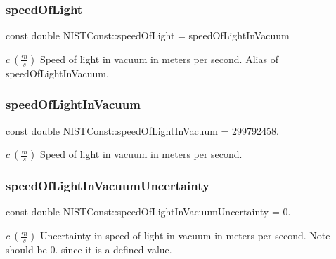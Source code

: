 \subsubsection{\texorpdfstring{speed\+Of\+Light}{speedOfLight}}
{\footnotesize\ttfamily const double N\+I\+S\+T\+Const\+::speed\+Of\+Light = speed\+Of\+Light\+In\+Vacuum}

$c \ (\frac{m}{s})$ Speed of light in vacuum in meters per second. Alias of speed\+Of\+Light\+In\+Vacuum. \mbox{\label{group___speed_of_light_gacb4a04d9cca33259effabdd28c28e964}} 
\subsubsection{\texorpdfstring{speed\+Of\+Light\+In\+Vacuum}{speedOfLightInVacuum}}
{\footnotesize\ttfamily const double N\+I\+S\+T\+Const\+::speed\+Of\+Light\+In\+Vacuum = 299792458.}

$c \ (\frac{m}{s})$ Speed of light in vacuum in meters per second. \mbox{\label{group___speed_of_light_gafb67b7afe777d6e23a70ae69e83542d1}} 
\subsubsection{\texorpdfstring{speed\+Of\+Light\+In\+Vacuum\+Uncertainty}{speedOfLightInVacuumUncertainty}}
{\footnotesize\ttfamily const double N\+I\+S\+T\+Const\+::speed\+Of\+Light\+In\+Vacuum\+Uncertainty = 0.}

$c \ (\frac{m}{s})$ Uncertainty in speed of light in vacuum in meters per second. Note should be 0. since it is a defined value. 